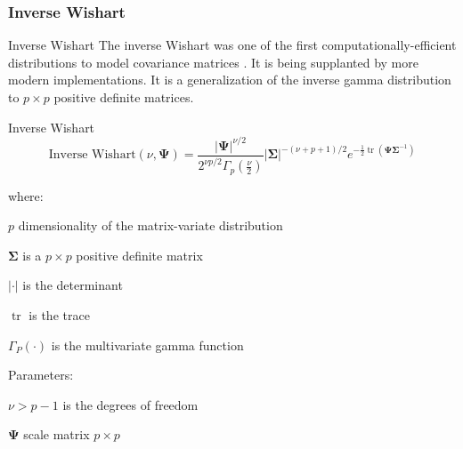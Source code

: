 \subsubsection*{Inverse Wishart}
\begin{frame}[noframenumbering]{Inverse Wishart}
	The inverse Wishart was one of the first computationally-efficient distributions to model covariance matrices \parencite{gelman2013bayesian}.
	It is being supplanted by more modern implementations.
	\vfill
	It is a generalization of the inverse gamma distribution to $p \times p$ positive definite matrices.
\end{frame}

\begin{frame}[noframenumbering]{Inverse Wishart}
	$$\text{Inverse Wishart} (\nu, \boldsymbol{\Psi}) = \frac{\left|\boldsymbol{\Psi}\right|^{\nu/2}}{2^{\nu p/2}\Gamma_p(\frac{\nu}{2})} \left|\boldsymbol{\Sigma}\right|^{-(\nu+p+1)/2} e^{-\frac{1}{2}\operatorname{tr}(\boldsymbol{\Psi}\boldsymbol{\Sigma}^{-1})}$$

	where:
	\begin{vfilleditems}
		\item $p$ dimensionality of the matrix-variate distribution
		\item $\boldsymbol{\Sigma}$ is a $p \times p$ positive definite matrix
		\item $\left| \cdot \right|$ is the determinant
		\item $\operatorname{tr}$ is the trace
		\item $\Gamma_P \left( \cdot \right)$ is the multivariate gamma function
	\end{vfilleditems}
	\vfill
	Parameters:
	\begin{vfilleditems}
		\item $\nu > p-1$ is the degrees of freedom
		\item $\boldsymbol{\Psi}$ scale matrix $p \times p$
	\end{vfilleditems}
\end{frame}

